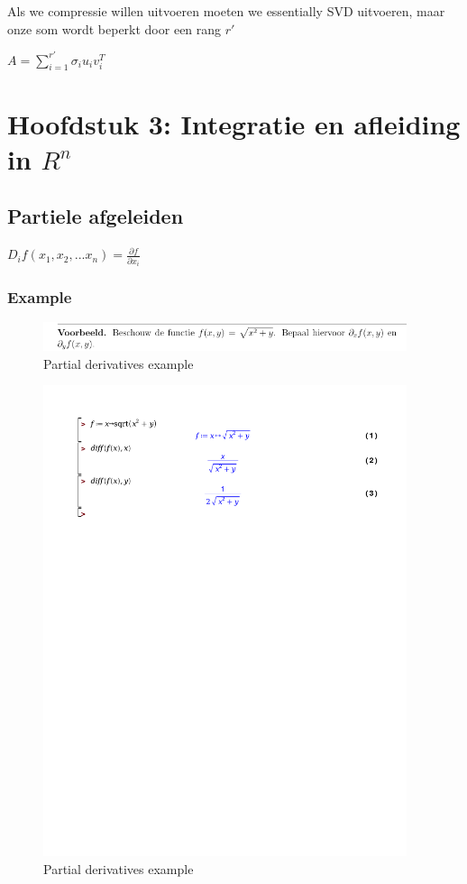 \documentclass[a4paper]{article}
\begin{document}
Als we compressie willen uitvoeren moeten we essentially SVD uitvoeren, maar onze som wordt beperkt door een rang $r'$

$A = \sum_{i=1}^{r'} \sigma_i u_i v_i^T$

\section{Hoofdstuk 3: Integratie en afleiding in $R^n$}

\subsection{Partiele afgeleiden}

$D_i f(x_1, x_2, ... x_n) = \frac{\partial f}{\partial x_i}$

\subsubsection{Example}

\begin{figure}[H]
	\begin{center}
		\includegraphics[width=0.95\textwidth]{./images/partial.png}
	\end{center}
	\caption{Partial derivatives example}
	\label{}
\end{figure}
\begin{figure}[H]
	\begin{center}
		\includegraphics[width=0.95\textwidth]{./partial.pdf}
	\end{center}
	\caption{Partial derivatives example}
	\label{}
\end{figure}
\end{document}

